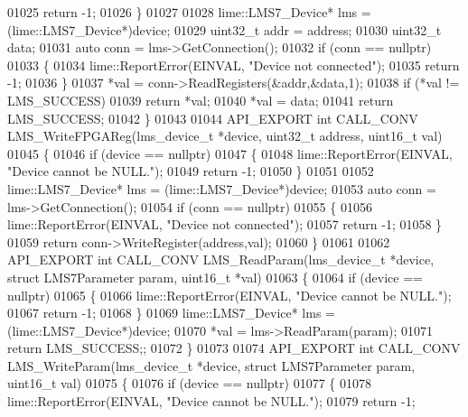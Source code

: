 \begin{DoxyCode}
01025         \textcolor{keywordflow}{return} -1;
01026     \}
01027 
01028     lime::LMS7_Device* lms = (lime::LMS7_Device*)device;
01029     uint32\_t addr = address;
01030     uint32\_t data;
01031     \textcolor{keyword}{auto} conn = lms->GetConnection();
01032     \textcolor{keywordflow}{if} (conn == \textcolor{keyword}{nullptr})
01033     \{
01034         lime::ReportError(EINVAL, \textcolor{stringliteral}{"Device not connected"});
01035         \textcolor{keywordflow}{return} -1;
01036     \}
01037     *val = conn->ReadRegisters(&addr,&data,1);
01038     \textcolor{keywordflow}{if} (*val != LMS_SUCCESS)
01039         \textcolor{keywordflow}{return} *val;
01040     *val = data;
01041     \textcolor{keywordflow}{return} LMS_SUCCESS;
01042 \}
01043 
01044 API_EXPORT \textcolor{keywordtype}{int} CALL_CONV LMS_WriteFPGAReg(lms_device_t *device, uint32\_t address, uint16\_t 
      val)
01045 \{
01046     \textcolor{keywordflow}{if} (device == \textcolor{keyword}{nullptr})
01047     \{
01048         lime::ReportError(EINVAL, \textcolor{stringliteral}{"Device cannot be NULL."});
01049         \textcolor{keywordflow}{return} -1;
01050     \}
01051 
01052     lime::LMS7_Device* lms = (lime::LMS7_Device*)device;
01053     \textcolor{keyword}{auto} conn = lms->GetConnection();
01054     \textcolor{keywordflow}{if} (conn == \textcolor{keyword}{nullptr})
01055     \{
01056         lime::ReportError(EINVAL, \textcolor{stringliteral}{"Device not connected"});
01057         \textcolor{keywordflow}{return} -1;
01058     \}
01059     \textcolor{keywordflow}{return} conn->WriteRegister(address,val);
01060 \}
01061 
01062 API_EXPORT \textcolor{keywordtype}{int} CALL_CONV LMS_ReadParam(lms_device_t *device, \textcolor{keyword}{struct} 
      LMS7Parameter param, uint16\_t *val)
01063 \{
01064     \textcolor{keywordflow}{if} (device == \textcolor{keyword}{nullptr})
01065     \{
01066         lime::ReportError(EINVAL, \textcolor{stringliteral}{"Device cannot be NULL."});
01067         \textcolor{keywordflow}{return} -1;
01068     \}
01069     lime::LMS7_Device* lms = (lime::LMS7_Device*)device;
01070     *val = lms->ReadParam(param);
01071     \textcolor{keywordflow}{return} LMS_SUCCESS;;
01072 \}
01073 
01074 API_EXPORT \textcolor{keywordtype}{int} CALL_CONV LMS_WriteParam(lms_device_t *device, \textcolor{keyword}{struct} 
      LMS7Parameter param, uint16\_t val)
01075 \{
01076     \textcolor{keywordflow}{if} (device == \textcolor{keyword}{nullptr})
01077     \{
01078         lime::ReportError(EINVAL, \textcolor{stringliteral}{"Device cannot be NULL."});
01079         \textcolor{keywordflow}{return} -1;

\end{DoxyCode}
